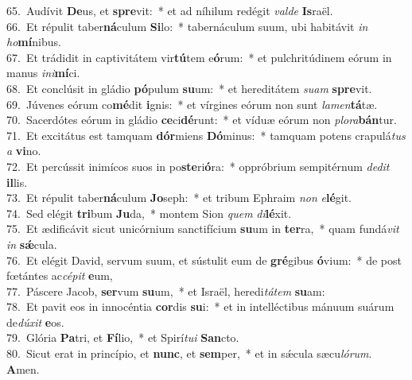 {65.~}Audívit \textbf{De}us, et \textbf{spre}vit:~* et ad níhilum redégit \textit{val}\textit{de} \textbf{Is}raël.\\
{66.~}Et répulit taber\textbf{ná}culum \textbf{Si}lo:~* tabernáculum suum, ubi habitávit \textit{in} \textit{ho}\textbf{mí}nibus.\\
{67.~}Et trádidit in captivitátem vir\textbf{tú}tem e\textbf{ó}rum:~* et pulchritúdinem eórum in manus \textit{i}\textit{ni}\textbf{mí}ci.\\
{68.~}Et conclúsit in gládio \textbf{pó}pulum \textbf{su}um:~* et hereditátem \textit{su}\textit{am} \textbf{spre}vit.\\
{69.~}Júvenes eórum co\textbf{mé}dit \textbf{i}gnis:~* et vírgines eórum non sunt \textit{la}\textit{men}\textbf{tá}tæ.\\
{70.~}Sacerdótes eórum in gládio \textbf{ce}ci\textbf{dé}runt:~* et víduæ eórum non \textit{plo}\textit{ra}\textbf{bán}tur.\\
{71.~}Et excitátus est tamquam \textbf{dór}miens \textbf{Dó}minus:~* tamquam potens crapulá\textit{tus} \textit{a} \textbf{vi}no.\\
{72.~}Et percússit inimícos suos in po\textbf{ste}ri\textbf{ó}ra:~* oppróbrium sempitérnum \textit{de}\textit{dit} \textbf{il}lis.\\
{73.~}Et répulit taber\textbf{ná}culum \textbf{Jo}seph:~* et tribum Ephraim \textit{non} \textit{e}\textbf{lé}git.\\
{74.~}Sed elégit \textbf{tri}bum \textbf{Ju}da,~* montem Sion \textit{quem} \textit{di}\textbf{lé}xit.\\
{75.~}Et ædificávit sicut unicórnium sanctifícium \textbf{su}um in \textbf{ter}ra,~* quam fundá\textit{vit} \textit{in} \textbf{sǽ}cula.\\
{76.~}Et elégit David, servum suum, et sústulit eum de \textbf{gré}gibus \textbf{ó}vium:~* de post fœtántes ac\textit{cé}\textit{pit} \textbf{e}um,\\
{77.~}Páscere Jacob, \textbf{ser}vum \textbf{su}um,~* et Israël, heredi\textit{tá}\textit{tem} \textbf{su}am:\\
{78.~}Et pavit eos in innocéntia \textbf{cor}dis \textbf{su}i:~* et in intelléctibus mánuum suárum de\textit{dú}\textit{xit} \textbf{e}os.\\
{79.~}Glória \textbf{Pa}tri, et \textbf{Fí}lio,~* et Spirí\textit{tu}\textit{i} \textbf{San}cto.\\
{80.~}Sicut erat in princípio, et \textbf{nunc}, et \textbf{sem}per,~* et in sǽcula sæcu\textit{ló}\textit{rum}. \textbf{A}men.\\
